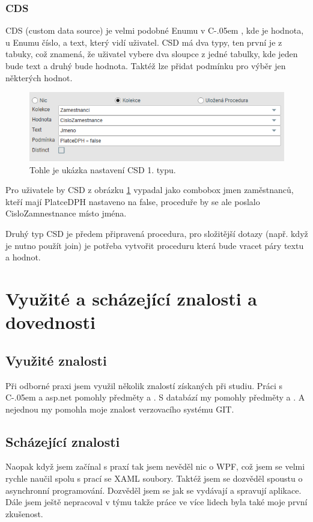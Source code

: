 \documentclass[czech,bachelorpractice,dept460,male,csharp]{diploma}
\newcommand{\Csharp}{%
  {\settoheight{\dimen0}{C}C\kern-.05em \resizebox{!}{\dimen0}{\raisebox{\depth}{\#}}}}
\begin{document}
		\subsubsection{CDS}
			CDS (custom data source) je velmi podobné Enumu v \Csharp, kde je hodnota, u Enumu číslo, a text, který vidí uživatel. CSD má dva typy, ten první je z tabuky, což znamená, že uživatel vybere dva sloupce z jedné tabulky, kde jeden bude text a druhý bude hodnota. Taktéž lze přidat podmínku pro výběr jen některých hodnot.
			\begin{figure}[h]
				\includegraphics{Figures/cds.png}
				\caption{Tohle je ukázka nastavení CSD 1. typu.}
    			\label{fig:CSDimg}
			\end{figure}
			
			Pro uživatele by CSD z obrázku \ref{fig:CSDimg} vypadal jako combobox jmen zaměstnanců, kteří mají PlatceDPH nastaveno na false, proceduře by se ale poslalo CisloZamnestnance místo jména.
			
			Druhý typ CSD je předem připravená procedura, pro složitější dotazy (např. když je nutno použít join) je potřeba vytvořit proceduru která bude vracet páry textu a hodnot.
			
\section{Využité a scházející znalosti a dovednosti}
	\subsection{Využité znalosti}
		Při odborné praxi jsem využil několik znalostí získaných při studiu. Práci s {\Csharp} a asp.net pomohly předměty  a . S databází my pomohly předměty  a . A nejednou my pomohla moje znalost verzovacího systému GIT.
	\subsection{Scházející znalosti}
		Naopak když jsem začínal s praxí tak jsem nevěděl nic o WPF, což jsem se velmi rychle naučil spolu s prací se XAML soubory. Taktéž jsem se dozvěděl spoustu o asynchronní programování. Dozvěděl jsem se jak se vydávají a spravují aplikace. Dále jsem ještě nepracoval v týmu takže práce ve více lidech byla také moje první zkušenost.
		
\end{document}
